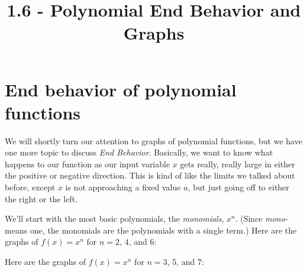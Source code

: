 \documentclass{ximera}
\title{1.6 - Polynomial End Behavior and Graphs}
\begin{document}
\begin{abstract} \end{abstract}
\maketitle


\section{End behavior of polynomial functions}
We will shortly turn our attention to graphs of polynomial functions, but we have one more topic to discuss \emph{End Behavior}.
Basically, we want to know what happens to our function as our input variable $x$ gets really, really large in either the positive or negative direction.
This is kind of like the limits we talked about before, except $x$ is not approaching a fixed value $a$, but just going off to either the right or the left.

We'll start with the most basic polynomials, the \emph{monomials}, $x^n$.  (Since \emph{mono-} means one, the monomials are the polynomials with a single term.)
Here are the graphs of $f(x)=x^n$ for $n = 2$, $4$, and $6$:
	\begin{center}
	\end{center}

	
Here are the graphs of $f(x)=x^n$ for $n = 3$, $5$, and $7$:
	\begin{center}
	\end{center}
\end{document}
